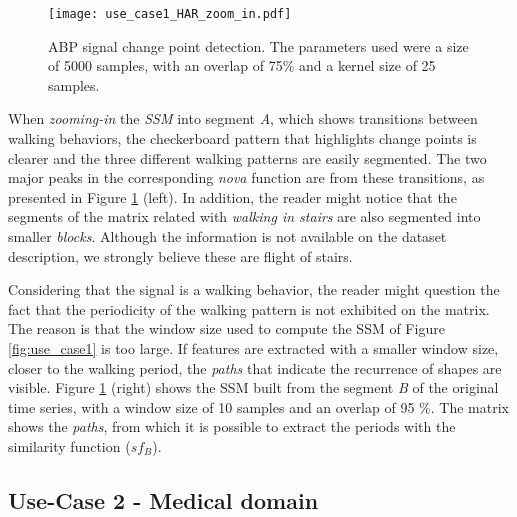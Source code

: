 \begin{figure}
    \centering
    \texttt{[image: use\_case1\_HAR\_zoom\_in.pdf]}
    \caption{ABP signal change point detection. The parameters used were a size of 5000 samples, with an overlap of 75\% and a kernel size of 25 samples.}
    \label{fig:example1_zoom}
\end{figure}

When \textit{zooming-in} the \textit{SSM} into segment \textit{A}, which shows transitions between walking behaviors, the checkerboard pattern that highlights change points is clearer and the three different walking patterns are easily segmented. The two major peaks in the corresponding \textit{nova} function are from these transitions, as presented in Figure \ref{fig:example1_zoom} (left). In addition, the reader might notice that the segments of the matrix related with \textit{walking in stairs} are also segmented into smaller \textit{blocks}. Although the information is not available on the dataset description, we strongly believe these are flight of stairs.
\par
Considering that the signal is a walking behavior, the reader might question the fact that the periodicity of the walking pattern is not exhibited on the matrix. The reason is that the window size used to compute the \gls{SSM} of Figure \ref{fig:use_case1} is too large. If features are extracted with a smaller window size, closer to the walking period, the \textit{paths} that indicate the recurrence of shapes are visible. Figure \ref{fig:example1_zoom} (right) shows the \gls{SSM} built from the segment \textit{B} of the original time series, with a window size of 10 samples and an overlap of 95 \%. The matrix shows the \textit{paths}, from which it is possible to extract the periods with the similarity function ($sf_B$).


\subsection{Use-Case 2 - Medical domain}

